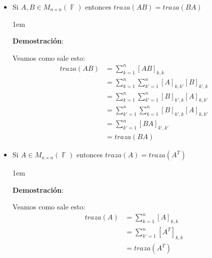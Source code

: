 \documentclass[12pt, fleqn]{report}                             %
\newenvironment{SmallIndentation}[1][0.75em]                    %
        {\begin{adjustwidth}{#1}{}\begin{footnotesize}}             %
        {\end{footnotesize}\end{adjustwidth}}                       %
\theoremstyle{break}                                            %
\DeclareMathOperator \GenericField {\mathbb{F}}                 %
\begin{document}
                \begin{itemize}
                    
                    \item
                        Si $A, B \in M_{n \times n}(\GenericField)$ entonces $traza(AB) = traza(BA)$
                        \begin{SmallIndentation}[1em]
                            \textbf{Demostración}:
                            
                            Veamos como sale esto:
                            \begin{align*}
                                traza(AB)
                                    &= \sum_{k = 1}^n [AB]_{k, k}                                \\
                                    &= \sum_{k = 1}^n \sum_{k' = 1}^n [A]_{k, k'} [B]_{k', k}    \\
                                    &= \sum_{k = 1}^n \sum_{k' = 1}^n [B]_{k', k} [A]_{k, k'}    \\
                                    &= \sum_{k' = 1}^n \sum_{k = 1}^n [B]_{k', k} [A]_{k, k'}    \\
                                    &= \sum_{k' = 1}^n [BA]_{k', k'}                             \\
                                    &= traza(BA)
                            \end{align*}
                        
                        \end{SmallIndentation}


                    \item
                        Si $A \in M_{n \times n}(\GenericField)$ entonces $traza(A) = traza(A^T)$
                        \begin{SmallIndentation}[1em]
                            \textbf{Demostración}:
                            
                            Veamos como sale esto:
                            \begin{align*}
                                traza(A)
                                    &= \sum_{k = 1}^n [A]_{k, k}                                 \\
                                    &= \sum_{k' = 1}^n [A^T]_{k, k}                              \\
                                    &= traza(A^T)
                            \end{align*}


\end{SmallIndentation}
\end{itemize}
\end{document}
